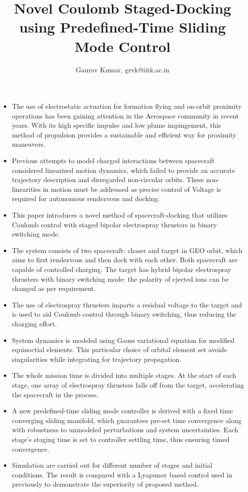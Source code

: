 \documentclass[]{article}
\title{Novel Coulomb Staged-Docking using Predefined-Time Sliding Mode Control}
\author{Gaurav Kumar, grvk@iitk.ac.in}
\begin{document}
	\maketitle
\begin{itemize}
	\item The use of electrostatic actuation for formation flying and on-orbit proximity operations has been gaining attention in the Aerospace community in recent years. With its high specific impulse and low plume impingement, this method of propulsion provides a sustainable and efficient way for proximity maneuvers. 
	\item Previous attempts to model charged interactions between spacecraft considered linearized motion dynamics, which failed to provide an accurate trajectory description and disregarded non-circular orbits. These non-linearities in motion must be addressed as precise control of Voltage is required for autonomous rendezvous and docking.
	\item  This paper introduces a novel method of spacecraft-docking that utilizes Coulomb control with staged bipolar electrospray thrusters in binary switching mode. 
	\item  The system consists of two spacecraft: chaser and target in GEO orbit, which aims to first rendezvous and then dock with each other. Both spacecraft are capable of controlled charging. The target has hybrid bipolar electrospray thrusters with binary switching mode: the polarity of ejected ions can be changed as per requirement.
	\item The use of electrospray thrusters imparts a residual voltage to the target and is used to aid Coulomb control through binary switching, thus reducing the charging effort. 
	\item System dynamics is modeled using Gauss variational equation for modified equinoctial elements. This particular choice of orbital element set avoids singularities while integrating for trajectory propagation. 
	  
	\item The whole mission time is divided into multiple stages. At the start of each stage, one array of electrospray thrusters falls off from the target, accelerating the spacecraft in the process.
	
	\item A new predefined-time sliding mode controller is derived with a fixed time converging sliding manifold, which guarantees pre-set time convergence along with robustness to unmodeled perturbations and system uncertainties. Each stage's staging time is set to controller settling time, thus ensuring timed convergence. 
	\item Simulation are carried out for different number of stages and initial conditions. The result is compared with a Lyapunov based control used in previously to demonstrate the superiority of proposed method. 
\end{itemize}
	
\end{document}
